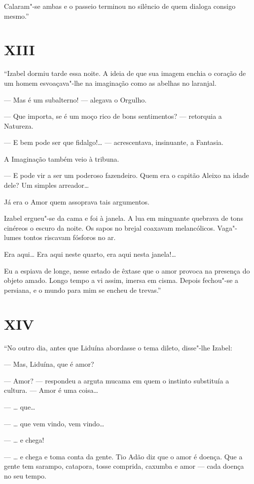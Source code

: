 Calaram"-se ambas e o passeio terminou no silêncio de quem dialoga
consigo mesmo.''

\section*{XIII}

``Izabel dormiu tarde essa noite. A ideia de que sua imagem enchia o
coração de um homem esvoaçava"-lhe na imaginação como as abelhas no
laranjal.

--- Mas é um subalterno! --- alegava o Orgulho.

--- Que importa, se é um moço rico de bons sentimentos? --- retorquia a
Natureza.

--- E bem pode ser que fidalgo!\ldots{} --- acrescentava, insinuante, a
Fantasia.

A Imaginação também veio à tribuna.

--- E pode vir a ser um poderoso fazendeiro. Quem era o capitão Aleixo
na idade dele? Um simples arreador\ldots{}

Já era o Amor quem assoprava tais argumentos.

Izabel ergueu"-se da cama e foi à janela. A lua em minguante quebrava de
tons cinéreos o escuro da noite. Os sapos no brejal coaxavam
melancólicos. Vaga"-lumes tontos riscavam fósforos no ar.

Era aqui\ldots{} Era aqui neste quarto, era aqui nesta janela!\ldots{}

Eu a espiava de longe, nesse estado de êxtase que o amor provoca na
presença do objeto amado. Longo tempo a vi assim, imersa em cisma.
Depois fechou"-se a persiana, e o mundo para mim se encheu de trevas.''

\section*{XIV}

``No outro dia, antes que Liduína abordasse o tema dileto, disse"-lhe
Izabel:

--- Mas, Liduína, que é amor?

--- Amor? --- respondeu a arguta mucama em quem o instinto substituía a
cultura. --- Amor é uma coisa\ldots{}

--- \ldots{} que\ldots{}

--- \ldots{} que vem vindo, vem vindo\ldots{}

--- \ldots{} e chega!

--- \ldots{} e chega e toma conta da gente. Tio Adão diz que o amor é doença.
Que a gente tem sarampo, catapora, tosse comprida, caxumba e amor ---
cada doença no seu tempo.

